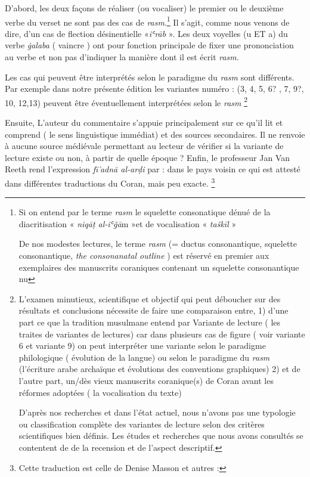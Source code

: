 \documentclass[a4paper,12pt]{report}
\begin{document}
\begin{itemize}
\begin{enumerate}
D'abord, les deux façons de réaliser (ou vocaliser) le premier ou le deuxième verbe du verset ne sont pas  des cas  de \textit{rasm}.\footnote {Si on entend par le terme \textit{rasm} le squelette consonatique dénué de la diacritisation   « \textit{niqāṭ al-iʿǧā}m  »et de vocalisation « \textit{taškīl} »

De nos modestes lectures, le terme \textit{rasm}  (= ductus consonantique, squelette consonantique, \textit{the consonanatal outline} ) est réservé en premier  aux exemplaires des manuscrits coraniques  contenant un squelette consonantique nu } Il s'agit, comme nous venons de dire, d'un cas de flection désinentielle  «\textit{iʿrāb} ». Les deux voyelles (u ET a) du verbe \textit{ġalaba}   ( vaincre ) ont pour fonction principale de fixer une prononciation au verbe et non pas d'indiquer la manière dont il est écrit \textit{rasm}.  

Les cas qui peuvent être interprétés selon le paradigme du \textit{rasm} sont différents. Par exemple dans notre présente édition les variantes numéro : (3, 4, 5, 6? , 7, 9?, 10, 12,13) peuvent être éventuellement interprétées  selon le  \textit{rasm} \footnote{ L'examen minutieux, scientifique et objectif qui peut déboucher sur des résultats et conclusions  nécessite de faire une comparaison entre, 1) d'une part ce que la tradition musulmane entend par Variante de lecture ( les traites de variantes de lectures) car dans plusieurs cas de figure ( voir variante 6 et variante 9) on peut interpréter une variante selon le paradigme philologique ( évolution de la langue) ou selon le paradigme du \textit{rasm} (l'écriture arabe archaïque et évolutions des conventions graphiques) 2) et de l'autre part, un/dès vieux manuscrits coranique(s) de Coran avant les réformes adoptées ( la vocalisation du texte)

D'après nos recherches et dans l'état actuel, nous n'avons pas une typologie ou classification  complète des variantes de lecture  selon des critères scientifiques bien définis. Les études et recherches que nous avons consultés se contentent de  de la recension et de l'aspect descriptif.}

Ensuite, L'auteur du commentaire s'appuie principalement sur ce qu'il lit et comprend ( le sens linguistique immédiat) et  des sources secondaires. Il ne renvoie à aucune source médiévale permettant au lecteur de vérifier si la variante de lecture existe ou non, à partir de quelle époque ?  Enfin, le professeur Jan Van Reeth  rend l'expression \textit{fī  ͗adnā al-arḍi } par : dans le pays voisin ce qui est attesté dans différentes traductions du Coran, mais peu exacte.    \footnote{ Cette traduction est celle de Denise Masson et autres :

}
\end{enumerate}
\end{itemize}
\end{document}
